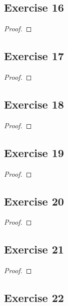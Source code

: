 \documentclass[14pt]{extarticle}
\begin{document}
\subsection{Exercise 16}

\begin{proof}

\end{proof}

\subsection{Exercise 17}

\begin{proof}

\end{proof}

\subsection{Exercise 18}

\begin{proof}

\end{proof}

\subsection{Exercise 19}

\begin{proof}

\end{proof}

\subsection{Exercise 20}

\begin{proof}

\end{proof}

\subsection{Exercise 21}

\begin{proof}

\end{proof}

\subsection{Exercise 22}
\end{document}
